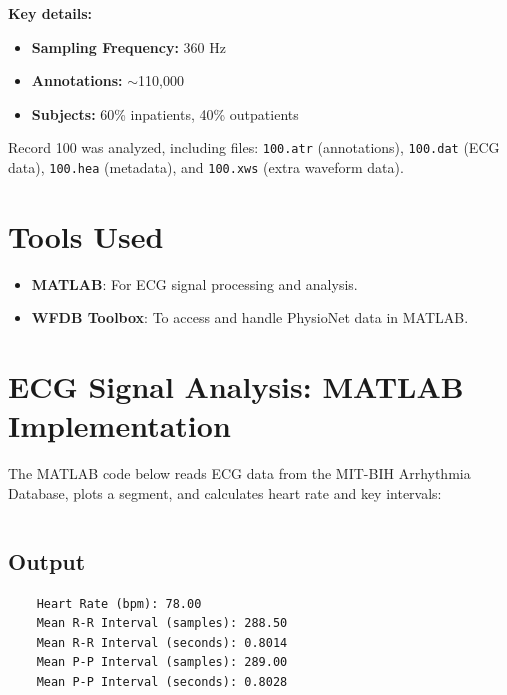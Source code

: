 \documentclass[a4paper,11pt]{article}
\begin{document}
\textbf{Key details:}
\begin{itemize}
    \item \textbf{Sampling Frequency:} 360 Hz
    \item \textbf{Annotations:} $\sim$110,000
    \item \textbf{Subjects:} 60\% inpatients, 40\% outpatients
\end{itemize}

Record 100 was analyzed, including files: \texttt{100.atr} (annotations), \texttt{100.dat} (ECG data), \texttt{100.hea} (metadata), and \texttt{100.xws} (extra waveform data).

\vspace{-.8em}

\section*{Tools Used}
\begin{itemize}
    \item \textbf{MATLAB}: For ECG signal processing and analysis.
    \item \textbf{WFDB Toolbox}: To access and handle PhysioNet data in MATLAB.
\end{itemize}

\vspace{-.8em}

\section*{ECG Signal Analysis: MATLAB Implementation}
The MATLAB code below reads ECG data from the MIT-BIH Arrhythmia Database, plots a segment, and calculates heart rate and key intervals:

\inputminted[fontsize=\small,breaklines, linenos]{matlab}{assets/ecg.m}

\vspace{-.8em}

\subsection*{Output}
\begin{verbatim}
    Heart Rate (bpm): 78.00
    Mean R-R Interval (samples): 288.50
    Mean R-R Interval (seconds): 0.8014
    Mean P-P Interval (samples): 289.00
    Mean P-P Interval (seconds): 0.8028
\end{verbatim}

\vspace{-.8em}
\end{document}
